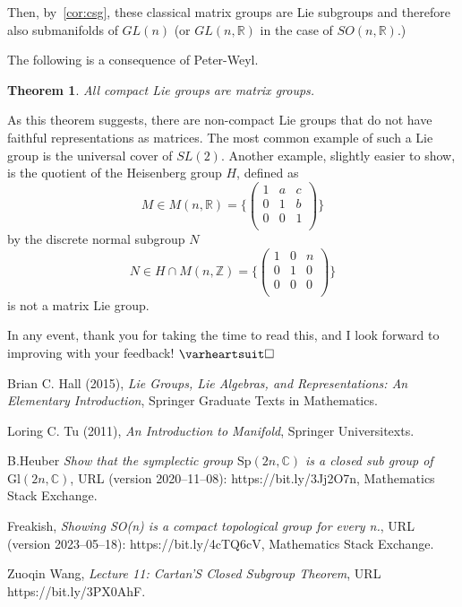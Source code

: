 \documentclass[12pt]{article}
\newcommand{\R}{\mathbb{R}}
\newcommand{\Z}{\mathbb{Z}}
\newcommand{\son}{SO (n, \R)}
\newcommand{\heart}{\ensuremath\varheartsuit}
\newtheorem{them}{Theorem}[section]
\theoremstyle{definition}
\theoremstyle{definition}
\theoremstyle{definition}
\theoremstyle{definition}
\theoremstyle{definition}
\theoremstyle{definition}
\theoremstyle{definition}
\theoremstyle{definition}
\begin{document}
Then, by~\ref{cor:csg}, these classical matrix
groups are Lie subgroups and therefore also
submanifolds of $GL(n)$ (or $GL(n, \R)$ in the case
of $\son$.)

\par{The following is a consequence of Peter-Weyl.}
\begin{them}
    All compact Lie groups
    are matrix groups.
\end{them}
\par{As this theorem suggests, there are
non-compact Lie groups that do not have faithful
representations as matrices. The most common
example of such a Lie group is the universal cover
of $SL(2)$. Another example, slightly easier to
show, is the quotient of the Heisenberg group $H$,
defined as
\[M \in M(n, \R) = \Bigg\{
\begin{pmatrix}
    1&a&c\\
    0&1&b\\
    0&0&1\\
\end{pmatrix} \Bigg\} \] 
by the discrete normal subgroup $N$
\[
    N \in H \cap M(n,\Z) = \Bigg\{
\begin{pmatrix}
    1&0&n\\
    0&1&0\\
    0&0&0\\
\end{pmatrix} \Bigg\}
\] is not a matrix Lie group.}

\vspace{6pt}
\par{In any event, thank you for taking the time
to read this, and I look forward to improving with
your feedback! $\heart \square$}

\begin{thebibliography}{9}
{Brian C. Hall (2015), \emph{Lie Groups, Lie Algebras,
and Representations: An Elementary
Introduction}, Springer Graduate Texts in Mathematics.}

Loring C. Tu (2011), \emph{An Introduction to Manifold},
Springer Universitexts.

B.Heuber \emph{Show that the symplectic group
$\mathrm{Sp}(2n,\mathbb{C})$ is a closed sub group
of $\mathrm{Gl}(2n,\mathbb{C})$}, URL (version
2020--11--08): https://bit.ly/3Jj2O7n, Mathematics Stack Exchange.

Freakish, \emph{Showing SO(n) is a compact
topological group for every n.}, URL (version
2023--05--18): https://bit.ly/4cTQ6cV, Mathematics Stack
Exchange.

Zuoqin Wang, \emph{Lecture 11: Cartan’S Closed
Subgroup Theorem}, URL https://bit.ly/3PX0AhF.
\end{thebibliography}
\end{document}

